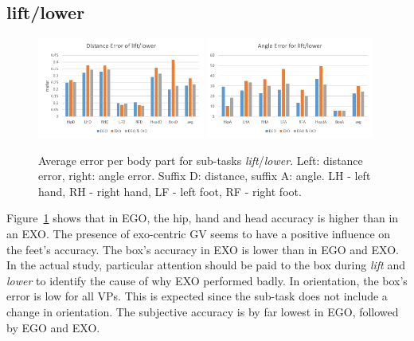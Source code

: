 \subsection{lift/lower}
\begin{figure}[H]
	\centering
	\includegraphics[width=0.49\textwidth]{figures/distanceErrorLiftLower.png}
	\includegraphics[width=0.49\textwidth]{figures/angleErrorLiftLower.png}
	\caption[Average error per body part for sub-tasks \textit{lift}/\textit{lower}.]{Average error per body part for sub-tasks \textit{lift}/\textit{lower}. Left: distance error, right: angle error. Suffix D: distance, suffix A: angle. LH - left hand, RH - right hand, LF - left foot, RF - right foot.}
	\label{fig:errorLiftLower}
\end{figure}
Figure~\ref{fig:errorLiftLower} shows that in EGO, the hip, hand and head accuracy is higher than in an EXO. The presence of exo-centric GV seems to have a positive influence on the feet's accuracy. The box's accuracy in EXO is lower than in EGO and EXO. In the actual study, particular attention should be paid to the box during \textit{lift} and \textit{lower} to identify the cause of why EXO performed badly. In orientation, the box's error is low for all VPs. This is expected since the sub-task does not include a change in orientation.
The subjective accuracy is by far lowest in EGO, followed by EGO and EXO.

